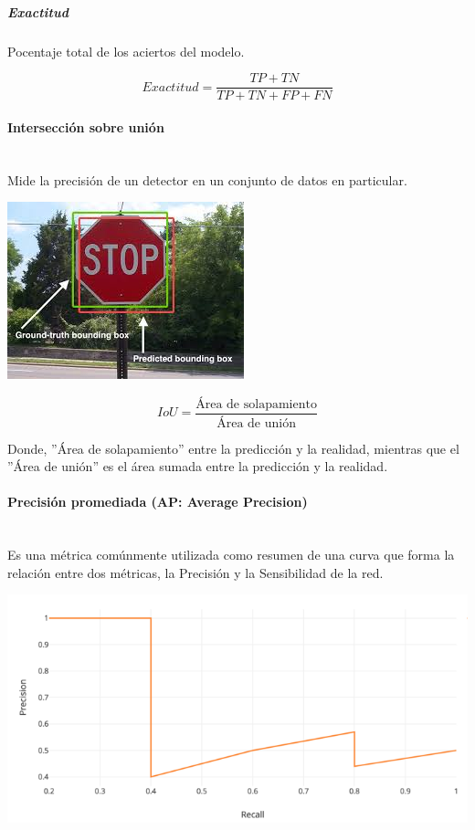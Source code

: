 \subparagraph{Exactitud}
Pocentaje total de los aciertos del modelo.

\[Exactitud = \frac{TP+TN}{TP+TN+FP+FN}\]

\paragraph{Intersección sobre unión}\mbox{}\\

Mide la precisión de un detector en un conjunto de datos en particular.

\begin{center}
    \includegraphics[scale=0.7]{Tesis/Capitulos/07_RESULTADOS/fig/IoU.jpeg}
\end{center}

\[IoU = \frac{\text{Área de solapamiento}}{\text{Área de unión}}\]

Donde, ''Área de solapamiento'' entre la predicción y la realidad, mientras que el ''Área de unión'' es el área sumada entre la predicción y la realidad.

\paragraph{Precisión promediada (AP: Average Precision)}\mbox{}\\

Es una métrica comúnmente utilizada como resumen de una curva que forma la relación entre dos métricas, la Precisión y la Sensibilidad de la red.\par

\begin{center}
    \includegraphics[scale=0.5]{Tesis/Capitulos/07_RESULTADOS/fig/PrecisionSensibilidad.png}
\end{center}

